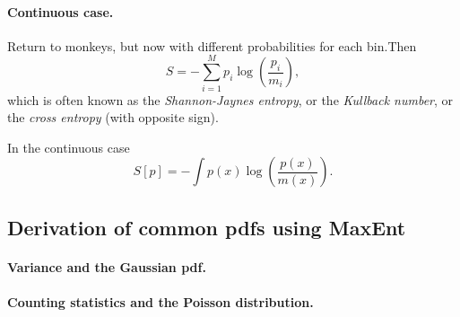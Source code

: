 \documentclass[%
oneside,                 %
final,                   %
10pt]{article}
\begin{document}
\paragraph{Continuous case.}
Return to monkeys, but now with different probabilities for each bin.Then
\[
S= −\sum_{i=1}^M p_i \log \left( \frac{p_i}{m_i} \right),
\]
which is often known as the \emph{Shannon-Jaynes entropy}, or the \emph{Kullback number}, or the \emph{cross entropy} (with opposite sign).

In the continuous case
\[
S[p]= −\int p(x) \log \left( \frac{p(x)}{m(x)} \right).
\]

\subsection{Derivation of common pdfs using MaxEnt}

\paragraph{Variance and the Gaussian pdf.}
\paragraph{Counting statistics and the Poisson distribution.}


\end{document}

